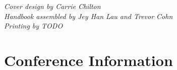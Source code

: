 \documentclass[twoside,makeidx]{book}
\begin{document}


\fancyfoot[C]{}




\thispagestyle{empty}
\vspace*{6in}
\noindent\emph{Cover design by Carrie Chilton}\\
\noindent\emph{Handbook assembled by Jey Han Lau and Trevor Cohn}\\ 
\emph{Printing by TODO}

\newpage
\cleardoublepage
\fancyfoot[C]{\thepage}
\frontmatter





\setcounter{tocdepth}{2}
\tableofcontents
\mainmatter
\pagestyle{fancy}


\chapter{Conference Information}


\clearpage


\clearpage%
\setheaders{}{}


%
\clearpage%
\setheaders{}{}


\clearpage



\end{document}
